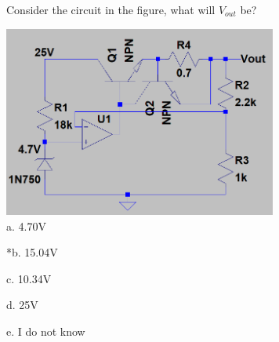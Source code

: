 
Consider the circuit in the figure, what will $V_{out}$ be?

\includegraphics[width=3.54097in,height=2.47396in]{../../Images/OPampsTransistorsDiodesQ6.png} \\


a. 4.70V

*b. 15.04V

c. 10.34V

d. 25V

e. I do not know \\
